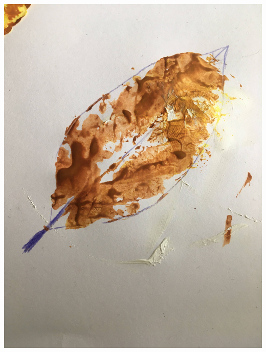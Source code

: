 \documentclass[12pt, letter]{article}
\begin{document}
\includegraphics[width=\textwidth,height=\textheight,keepaspectratio]{leaf-print-and-pencil.jpg}
\newpage
\end{document}
